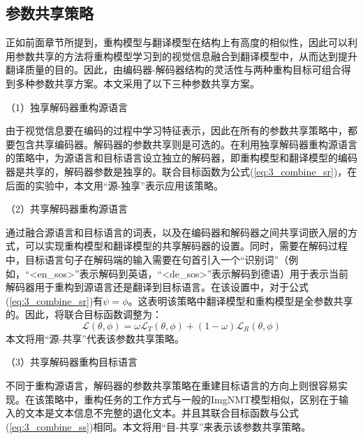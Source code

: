 \subsection{参数共享策略}
\label{sec:3_parameter_sharing}
% 
正如前面章节所提到，重构模型与翻译模型在结构上有高度的相似性，因此可以利用参数共享的方法将重构模型学习到的视觉信息融合到翻译模型中，从而达到提升翻译质量的目的。因此，由编码器-解码器结构的灵活性与两种重构目标可组合得到多种参数共享方案。本文采用了以下三种参数共享方案。

（1）{\sffamily 独享解码器重构源语言}


由于视觉信息要在编码的过程中学习特征表示，因此在所有的参数共享策略中，都要包含共享编码器。解码器的参数共享则是可选的。在利用独享解码器重构源语言的策略中，为源语言和目标语言设立独立的解码器，即重构模型和翻译模型的编码器是共享的，解码器参数是独享的。联合目标函数为公式(\ref{eq:3_combine_sr})，在后面的实验中，本文用“源-独享”表示应用该策略。

（2）{\sffamily 共享解码器重构源语言}


通过融合源语言和目标语言的词表，以及在编码器和解码器之间共享词嵌入层的方式，可以实现重构模型和翻译模型的共享解码器的设置。同时，需要在解码过程中，目标语言句子在解码端的输入需要在句首引入一个“识别词”（例如，“<en\_sos>”表示解码到英语，“<de\_sos>”表示解码到德语）用于表示当前解码器用于重构到源语言还是翻译到目标语言。在该设置中，对于公式(\ref{eq:3_combine_sr})有$\psi=\phi$。这表明该策略中翻译模型和重构模型是全参数共享的。因此，将联合目标函数调整为：
\begin{equation}
    \mathcal{L}(\theta, \phi)=\omega \mathcal{L}_T(\theta, \phi) + (1-\omega)\mathcal{L}_R(\theta, \phi)
    \label{eq:3_combine_ss}
\end{equation}
本文将用“源-共享”代表该参数共享策略。

（3）{\sffamily 共享解码器重构目标语言}


不同于重构源语言，解码器的参数共享策略在重建目标语言的方向上则很容易实现。在该策略中，重构任务的工作方式与一般的ImgNMT模型相似，区别在于输入的文本是文本信息不完整的退化文本。并且其联合目标函数与公式(\ref{eq:3_combine_ss})相同。本文将用“目-共享”来表示该参数共享策略。